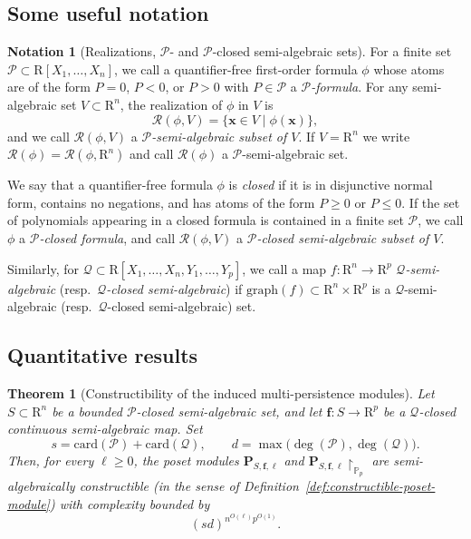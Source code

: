 \documentclass{amsart}[10pts]
\newtheorem{theorem}{Theorem}
\theoremstyle{definition}
\newtheorem{notation}{Notation}[section]
\theoremstyle{remark}
\theoremstyle{observation}
\numberwithin{equation}{section}
\newcommand {\R} {\mathrm{R}}
\newcommand {\RR} {{\mathcal R}}
\newcommand {\PP}     {\mathbb{P}} %
\newcommand{\card}{\mathrm{card}}
\newcommand{\x}{\mathbf{x}}
\begin{document}
\subsection{Some useful notation}
\begin{notation}[Realizations, $\mathcal P$- and $\mathcal P$-closed semi-algebraic sets]
For a finite set $\mathcal P\subset \R[X_1,\ldots,X_n]$, we call a quantifier-free first-order formula $\phi$ whose atoms are of the form
$P=0$, $P<0$, or $P>0$ with $P\in \mathcal P$ a \emph{$\mathcal P$-formula}.
For any semi-algebraic set $V\subset \R^n$, the realization of $\phi$ in $V$ is
\[
\RR(\phi,V)=\{\x\in V \mid \phi(\x)\},
\]
and we call $\RR(\phi,V)$ a \emph{$\mathcal P$-semi-algebraic subset of $V$}.
If $V=\R^n$ we write $\RR(\phi)=\RR(\phi,\R^n)$ and call $\RR(\phi)$ a $\mathcal P$-semi-algebraic set.

\medskip
We say that a quantifier-free formula $\phi$ is \emph{closed} if it is in disjunctive normal form, contains no negations, and has atoms of the form $P\ge 0$ or $P\le 0$.
If the set of polynomials appearing in a closed formula is contained in a finite set $\mathcal P$, we call $\phi$ a \emph{$\mathcal P$-closed formula}, and call $\RR(\phi,V)$ a \emph{$\mathcal P$-closed semi-algebraic subset of $V$}.

\medskip
Similarly, for $\mathcal Q\subset \R[X_1,\ldots,X_n,Y_1,\ldots,Y_p]$, we call a map $f:\R^n\to \R^p$ \emph{$\mathcal Q$-semi-algebraic} (resp.\ \emph{$\mathcal Q$-closed semi-algebraic}) if $\mathrm{graph}(f)\subset \R^n\times \R^p$ is a $\mathcal Q$-semi-algebraic (resp.\ $\mathcal Q$-closed semi-algebraic) set.
\end{notation}


\subsection{Quantitative results}
\label{subsec:main:quantitative}

\begin{theorem}[Constructibility of the induced multi-persistence modules]
\label{thm:main}
Let $S\subset \R^n$ be a bounded $\mathcal P$-closed semi-algebraic set, and let $\mathbf f:S\to \R^p$ be a $\mathcal Q$-closed continuous semi-algebraic map.
Set
\[
s=\card(\mathcal P)+\card(\mathcal Q),
\qquad
d=\max\bigl(\deg(\mathcal P),\deg(\mathcal Q)\bigr).
\]
Then, for every $\ell\ge 0$, the poset modules $\mathbf P_{S,\mathbf f,\ell}$ and $\mathbf P_{S,\mathbf f,\ell}\!\restriction_{\PP_p}$ are semi-algebraically constructible (in the sense of Definition~\ref{def:constructible-poset-module}) with complexity bounded by
\[
(s d)^{n^{O(\ell)}p^{O(1)}}.
\]
\end{theorem}
\end{document}
